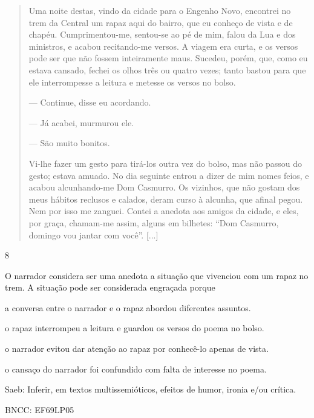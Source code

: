 \begin{quote}
Uma noite destas, vindo da cidade para o Engenho Novo, encontrei no trem
da Central um rapaz aqui do bairro, que eu conheço de vista e de chapéu.
Cumprimentou-me, sentou-se ao pé de mim, falou da Lua e dos ministros, e
acabou recitando-me versos. A viagem era curta, e os versos pode ser que
não fossem inteiramente maus. Sucedeu, porém, que, como eu estava
cansado, fechei os olhos três ou quatro vezes; tanto bastou para que ele
interrompesse a leitura e metesse os versos no bolso.

--- Continue, disse eu acordando.

--- Já acabei, murmurou ele.

--- São muito bonitos.

Vi-lhe fazer um gesto para tirá-los outra vez do bolso, mas não passou
do gesto; estava amuado. No dia seguinte entrou a dizer de mim nomes
feios, e acabou alcunhando-me Dom Casmurro. Os vizinhos, que não gostam
dos meus hábitos reclusos e calados, deram curso à alcunha, que afinal
pegou. Nem por isso me zanguei. Contei a anedota aos amigos da cidade, e
eles, por graça, chamam-me assim, alguns em bilhetes: ``Dom Casmurro,
domingo vou jantar com você''. {[}...{]}
\end{quote}


\num{8}

O narrador considera ser uma anedota a situação que vivenciou com um
rapaz no trem. A situação pode ser considerada engraçada porque

\begin{escolha}
\item a conversa entre o narrador e o rapaz abordou diferentes assuntos.

\item o rapaz interrompeu a leitura e guardou os versos do poema no bolso.

\item o narrador evitou dar atenção ao rapaz por conhecê-lo apenas de
vista.

\item o cansaço do narrador foi confundido com falta de interesse no poema.
\end{escolha}

Saeb: Inferir, em textos multissemióticos, efeitos de humor, ironia e/ou
crítica.

BNCC: EF69LP05

